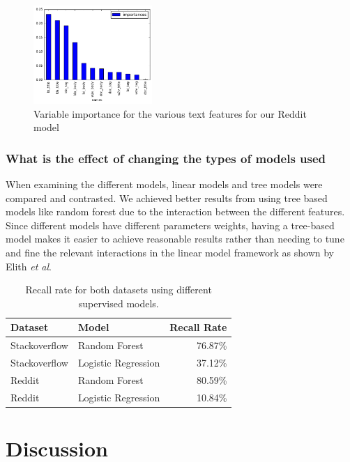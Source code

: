 \documentclass[journal,12pt,onecolumn,draftclsnofoot,]{IEEEtran}
\begin{document}
\begin{figure}[ht]
\centering
\caption{Variable importance for the various text features for our Reddit model}
\includegraphics[width=0.4\textwidth]{reddit_varimp.png}
\end{figure}



\subsubsection{What is the effect of changing the types of models used}

When examining the different models, linear models and tree models were compared and contrasted. We achieved better results from using tree based models like random forest due to the interaction between the different features. Since different models have different parameters weights, having a tree-based model makes it easier to achieve reasonable results rather than needing to tune and fine the relevant interactions in the linear model framework as shown by Elith \emph{et al}\cite{gbminteraction}.

\begin{table}[h!]
\centering
\caption{Recall rate for both datasets using different supervised models.}
 \begin{tabular}{|l l r|}
 \hline
 Dataset & Model & Recall Rate  \\ [0.5ex]
 \hline\hline
 Stackoverflow & Random Forest & 76.87\%  \\
 Stackoverflow & Logistic Regression & 37.12\%  \\
 \hline
  Reddit & Random Forest & 80.59\%  \\
  Reddit & Logistic Regression & 10.84\%  \\
 \hline
\end{tabular}
\end{table}

\section{Discussion}
\end{document}
